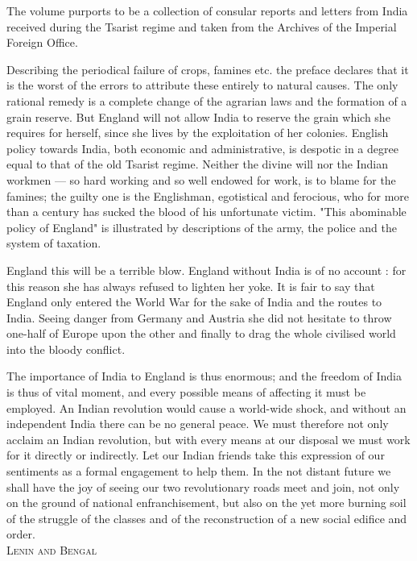 The volume purports to be a collection of consular reports and letters from India received during the Tsarist regime and taken from the Archives of the Imperial Foreign Office. 

Describing the periodical failure of crops, famines etc. the preface declares that it is the worst of the errors to attribute these entirely to natural causes. The only rational remedy is a complete change of the agrarian laws and the formation of a grain reserve. But England will not allow India to reserve the grain which she requires for herself, since she lives by the exploitation of her colonies. English policy towards India, both economic and administrative, is despotic in a degree equal to that of the old Tsarist regime. Neither the divine will nor the Indian workmen — so hard working and so well endowed for work, is to blame for the famines; the guilty one is the Englishman, egotistical and ferocious, who for more than a century has sucked the blood of his unfortunate victim. "This abominable policy of England" is illustrated by descriptions of the army, the police and the system of taxation.

England this will be a terrible blow. England without India is of no account : for this reason she has always refused to lighten her yoke. It is fair to say that England only entered the World War for the sake of India and the routes to India. Seeing danger from Germany and Austria she did not hesitate to throw one-half of Europe upon the other and finally to drag the whole civilised world into the bloody conflict. 

The importance of India to England is thus enormous; and the freedom of India is thus of vital moment, and every possible means of affecting it must be employed. An Indian revolution would cause a world-wide shock, and without an independent India there can be no general peace. We must therefore not only acclaim an Indian revolution, but with every means at our disposal we must work for it directly or indirectly. Let our Indian friends take this expression of our sentiments as a formal engagement to help them. In the not distant future we shall have the joy of seeing our two revolutionary roads meet and join, not only on the ground of national enfranchisement, but also on the yet more burning soil of the struggle of the classes and of the reconstruction of a new social edifice and order. \\


\textsc{Lenin and Bengal}\\

